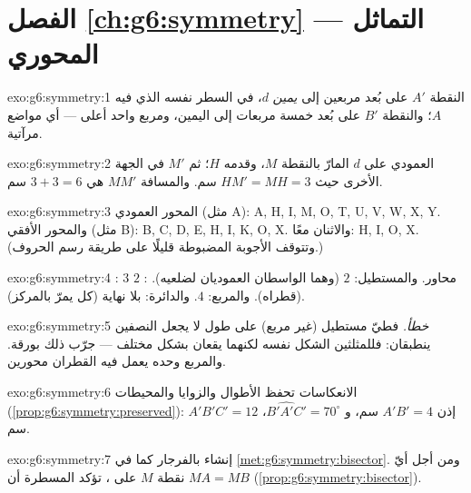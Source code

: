 \section*{الفصل \ref{ch:g6:symmetry} --- التماثل المحوري}

\begin{solution}{exo:g6:symmetry:1}
النقطة $A'$ على بُعد مربعين إلى \emph{يمين} $d$، في السطر نفسه الذي فيه
$A$؛ والنقطة $B'$ على بُعد خمسة مربعات إلى اليمين، ومربع واحد أعلى --- أي مواضع
مرآتية.
\end{solution}

\begin{solution}{exo:g6:symmetry:2}
العمودي على $d$ المارّ بالنقطة $M$، وقدمه $H$؛ ثم $M'$ في الجهة
الأخرى حيث $HM' = MH = 3$ سم. والمسافة $MM'$ هي
$3 + 3 = 6$ سم.
\end{solution}

\begin{solution}{exo:g6:symmetry:3}
المحور العمودي (مثل A): A, H, I, M, O, T, U, V, W, X, Y.
والمحور الأفقي (مثل B): B, C, D, E, H, I, K, O, X.
والاثنان معًا: H, I, O, X.
(وتتوقف الأجوبة المضبوطة قليلًا على طريقة رسم الحروف.)
\end{solution}

\begin{solution}{exo:g6:symmetry:4}
: $3$ محاور. والمستطيل: $2$ (وهما الواسطان
العموديان لضلعيه). : $2$ (قطراه). والمربع: $4$.
والدائرة: بلا نهاية (كل  يمرّ بالمركز).
\end{solution}

\begin{solution}{exo:g6:symmetry:5}
\emph{خطأ.} فطيّ مستطيل (غير مربع) على طول  لا
يجعل النصفين ينطبقان: فللمثلثين الشكل نفسه
لكنهما يقعان بشكل مختلف --- جرّب ذلك بورقة. والمربع وحده
يعمل فيه القطران محورين.
\end{solution}

\begin{solution}{exo:g6:symmetry:6}
الانعكاسات تحفظ الأطوال والزوايا والمحيطات
(\cref{prop:g6:symmetry:preserved}): إذن $A'B' = 4$ سم،
و $\widehat{B'A'C'} = 70^\circ$،  $A'B'C' = 12$ سم.
\end{solution}

\begin{solution}{exo:g6:symmetry:7}
إنشاء بالفرجار كما في \cref{met:g6:symmetry:bisector}. ومن أجل أيّ
نقطة $M$ على ، تؤكد المسطرة أن $MA = MB$
(\cref{prop:g6:symmetry:bisector}).
\end{solution}

